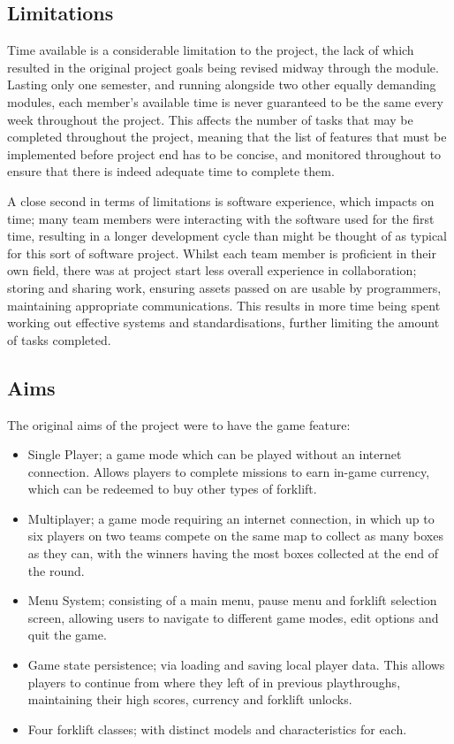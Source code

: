 \documentclass[12pt]{article}
\begin{document}
\subsection{Limitations}
Time available is a considerable limitation to the project, the lack of which resulted in the original project goals being revised midway through the module. Lasting only one semester, and running alongside two other equally demanding modules, each member’s available time is never guaranteed to be the same every week throughout the project. This affects the number of tasks that may be completed throughout the project, meaning that the list of features that must be implemented before project end has to be concise, and monitored throughout to ensure that there is indeed adequate time to complete them.

A close second in terms of limitations is software experience, which impacts on time; many team members were interacting with the software used for the first time, resulting in a longer development cycle than might be thought of as typical for this sort of software project. Whilst each team member is proficient in their own field, there was at project start less overall experience in collaboration; storing and sharing work, ensuring assets passed on are usable by programmers, maintaining appropriate communications. This results in more time being spent working out effective systems and standardisations, further limiting the amount of tasks completed.


\subsection{Aims}
The original aims of the project were to have the game feature:
\begin{itemize}
	\item Single Player; a game mode which can be played without an internet connection. Allows players to complete missions to earn in-game currency, which can be redeemed to buy other types of forklift.
	\item Multiplayer; a game mode requiring an internet connection, in which up to six players on two teams compete on the same map to collect as many boxes as they can, with the winners having the most boxes collected at the end of the round.
	\item Menu System; consisting of a main menu, pause menu and forklift selection screen, allowing users to navigate to different game modes, edit options and quit the game. 
	\item Game state persistence; via loading and saving local player data. This allows players to continue from where they left of in previous playthroughs, maintaining their high scores, currency and forklift unlocks.
	\item Four forklift classes; with distinct models and characteristics for each.
\end{itemize}
\end{document}
